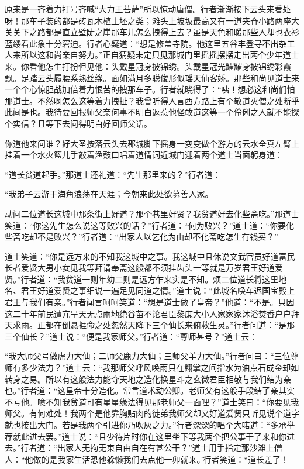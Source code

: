 \documentclass[12pt,UTF8]{ctexbook}
\begin{document}
原来是一齐着力打号齐喊“大力王菩萨”所以惊动唐僧。行者渐渐按下云头来看处呀！那车子装的都是砖瓦木植土坯之类；滩头上坡坂最高又有一道夹脊小路两座大关关下之路都是直立壁陡之崖那车儿怎么拽得上去？虽是天色和暖那些人却也衣衫蓝缕看此象十分窘迫。行者心疑道：“想是修盖寺院。他这里五谷丰登寻不出杂工人来所以这和尚亲自努力。”正自猜疑未定只见那城门里摇摇摆摆走出两个少年道士来。你看他怎生打扮但见他：头戴星冠身披锦绣。头戴星冠光耀耀身披锦绣彩霞飘。足踏云头履腰系熟丝绦。面如满月多聪俊形似瑶天仙客娇。那些和尚见道士来一个个心惊胆战加倍着力恨苦的拽那车子。行者就晓得了：“咦！想必这和尚们怕那道士。不然啊怎么这等着力拽扯？我曾听得人言西方路上有个敬道灭僧之处断乎此间是也。我待要回报师父奈何事不明白返惹他怪敢道这等一个伶俐之人就不能探个实信？且等下去问得明白好回师父话。

你道他来问谁？好大圣按落云头去郡城脚下摇身一变变做个游方的云水全真左臂上挂着一个水火篮儿手敲着渔鼓口唱着道情词近城门迎着两个道士当面躬身道：

“道长贫道起手。”那道士还礼道：“先生那里来的？”行者道：

“我弟子云游于海角浪荡在天涯；今朝来此处欲募善人家。

动问二位道长这城中那条街上好道？那个巷里好贤？我贫道好去化些斋吃。”那道士笑道：“你这先生怎么说这等败兴的话？”行者道：“何为败兴？”道士道：“你要化些斋吃却不是败兴？”行者道：“出家人以乞化为由却不化斋吃怎生有钱买？”

道士笑道：“你是远方来的不知我这城中之事。我这城中且休说文武官员好道富民长者爱贤大男小女见我等拜请奉斋这般都不须挂齿头一等就是万岁君王好道爱贤。”行者道：“我贫道一则年幼二则是远方乍来实是不知。烦二位道长将这里地名、君王好道爱贤之事细说一遍足见同道之情。”道士说：“此城名唤车迟国宝殿上君王与我们有亲。”行者闻言呵呵笑道：“想是道士做了皇帝？”他道：“不是。只因这二十年前民遭亢旱天无点雨地绝谷苗不论君臣黎庶大小人家家家沐浴焚香户户拜天求雨。正都在倒悬捱命之处忽然天降下三个仙长来俯救生灵。”行者问道：“是那三个仙长？”道士说：“便是我家师父。”行者道：“尊师甚号？”道士云：

“我大师父号做虎力大仙；二师父鹿力大仙；三师父羊力大仙。”行者问曰：“三位尊师有多少法力？”道士云：“我那师父呼风唤雨只在翻掌之间指水为油点石成金却如转身之易。所以有这般法力能夺天地之造化换星斗之玄微君臣相敬与我们结为亲也。”行者道：“这皇帝十分造化。常言道术动公卿。老师父有这般手段结了亲其实不亏他。噫不知我贫道可有星星缘法得见那老师父一面哩？”道士笑曰：“你要见我师父。有何难处！我两个是他靠胸贴肉的徒弟我师父却又好道爱贤只听见说个道字就也接出大门。若是我两个引进你乃吹灰之力。”行者深深的唱个大喏道：“多承举荐就此进去罢。”道士说：“且少待片时你在这里坐下等我两个把公事干了来和你进去。”行者道：“出家人无拘无束自由自在有甚公干？”道士用手指定那沙滩上僧人：“他做的是我家生活恐他躲懒我们去点他一卯就来。’行者笑道：“道长差了！
\end{document}

